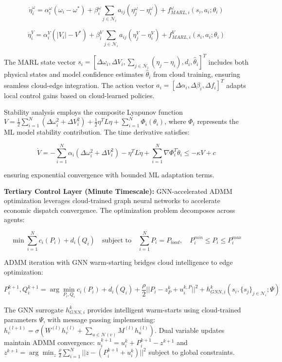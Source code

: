 \documentclass[12pt]{article}
\begin{document}
$$\dot{\eta}_i^{\omega} = \alpha_i^{\omega}(\omega_i - \omega^*) + \beta_i^{\omega} \sum_{j \in \mathcal{N}_i} a_{ij}(\eta_j^{\omega} - \eta_i^{\omega}) + f_{MARL,i}^{\omega}(s_i, a_i; \theta_i)$$

$$\dot{\eta}_i^{V} = \alpha_i^{V}(|V_i| - V^*) + \beta_i^{V} \sum_{j \in \mathcal{N}_i} a_{ij}(\eta_j^{V} - \eta_i^{V}) + f_{MARL,i}^{V}(s_i, a_i; \theta_i)$$

The MARL state vector $s_i = [\Delta\omega_i, \Delta V_i, \sum_{j \in \mathcal{N}_i}(\eta_j - \eta_i), d_i, \hat{\theta}_i]^T$ includes both physical states and model confidence estimates $\hat{\theta}_i$ from cloud training, ensuring seamless cloud-edge integration. The action vector $a_i = [\Delta\alpha_i, \Delta\beta_i, \Delta f_i]^T$ adapts local control gains based on cloud-learned policies.

Stability analysis employs the composite Lyapunov function $V = \frac{1}{2}\sum_{i=1}^N (\Delta\omega_i^2 + \Delta V_i^2) + \frac{1}{2}\eta^T L \eta + \sum_{i=1}^N \Phi_i(\theta_i)$, where $\Phi_i$ represents the ML model stability contribution. The time derivative satisfies:

$$\dot{V} = -\sum_{i=1}^N \alpha_i(\Delta\omega_i^2 + \Delta V_i^2) - \eta^T L \dot{\eta} + \sum_{i=1}^N \nabla\Phi_i^T \dot{\theta}_i \leq -\kappa V + c$$

ensuring exponential convergence with bounded ML adaptation terms.

\textbf{Tertiary Control Layer (Minute Timescale):} GNN-accelerated ADMM optimization leverages cloud-trained graph neural networks to accelerate economic dispatch convergence. The optimization problem decomposes across agents:

$$\min \sum_{i=1}^N c_i(P_i) + d_i(Q_i) \quad \text{subject to} \quad \sum_{i=1}^N P_i = P_{load}, \quad P_i^{min} \leq P_i \leq P_i^{max}$$

ADMM iteration with GNN warm-starting bridges cloud intelligence to edge optimization:

$$P_i^{k+1}, Q_i^{k+1} = \arg\min_{P_i,Q_i} c_i(P_i) + d_i(Q_i) + \frac{\rho}{2}||P_i - z_P^k + u_i^{k,P}||^2 + h_{GNN,i}^k(s_i, \{s_j\}_{j \in \mathcal{N}_i}; \Psi)$$

The GNN surrogate $h_{GNN,i}^k$ provides intelligent warm-starts using cloud-trained parameters $\Psi$, with message passing implementing: $h_v^{(l+1)} = \sigma\left(W^{(l)} h_v^{(l)} + \sum_{u \in \mathcal{N}(v)} M^{(l)} h_u^{(l)}\right)$. Dual variable updates maintain ADMM convergence: $u_i^{k+1} = u_i^k + P_i^{k+1} - z^{k+1}$ and $z^{k+1} = \arg\min_z \frac{\rho}{2}\sum_{i=1}^N ||z - (P_i^{k+1} + u_i^k)||^2$ subject to global constraints.
\end{document}
